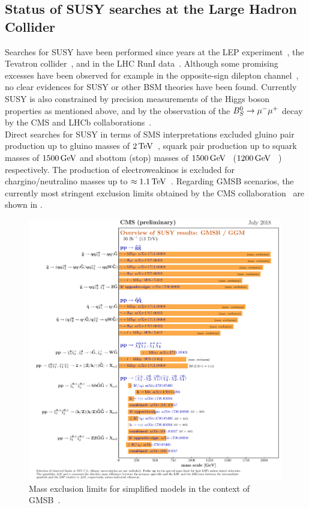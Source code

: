 \subsection{Status of SUSY searches at the Large Hadron Collider}
Searches for SUSY have been performed since years at the LEP experiment~\cite{LEP}, the Tevatron collider~\cite{TEVATRON}, and in the LHC RunI data~\cite{ChristianRunI}. Although some promising excesses have been observed for example in the opposite-sign dilepton channel~\cite{Edge}, no clear evidences for SUSY or other BSM theories have been found. Currently SUSY is also constrained by precision measurements of the Higgs boson properties as mentioned above, and by the observation of the $B_S^0\to{\mu^-}{\mu^+}$ decay by the CMS and LHCb collaborations~\cite{B0S}.\\
Direct searches for SUSY in terms of SMS interpretations excluded gluino pair production up to gluino masses of $2\,\text{Te\hspace{-.08em}V}$~\cite{GluinoCMS}, squark pair production up to squark masses of $1500\,\text{Ge\hspace{-.08em}V}$ and sbottom (stop) masses of $1500\,\text{Ge\hspace{-.08em}V}$~\cite{sbottom} ($1200\,\text{Ge\hspace{-.08em}V}$ ~\cite{stop}) respectively. The production of electroweakinos is excluded for chargino/neutralino masses up to $\approx 1.1\,\text{Te\hspace{-.08em}V}$~\cite{EWKinos}.
Regarding GMSB scenarios, the currently most stringent exclusion limits obtained by the CMS collaboration~\cite{CMS} are shown in .
\begin{figure}[hbtp]
 \centering
 \includegraphics[width=0.99\textwidth]{figures/general/barplot_GMSB}
 \caption{Mass exclusion limits for simplified models in the context of GMSB~\cite{SUSSummaryPlot}.}
 \label{fig:GMSB_summary}
\end{figure}

